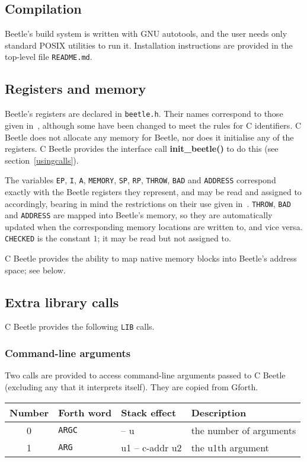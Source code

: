 \documentclass[english]{article}
\newcommand{\spic}[1]{{\spfont\setlength{\baselineskip}{\normalbaselineskip}#1\/}}
\begin{document}
\subsection{Compilation}

Beetle's build system is written with GNU autotools, and the user
needs only standard POSIX utilities to run it. Installation
instructions are provided in the top-level file {\tt README.md}.


\subsection{Registers and memory}

Beetle's registers are declared in {\tt beetle.h}. Their names correspond to
those given in~\cite[section~2.1]{beetle}, although some have been changed
to meet the rules for C identifiers. C Beetle does not allocate any
memory for Beetle, nor does it initialise any of the registers. C Beetle
provides the interface call {\bf init\_beetle()} to do this (see
section~\ref{usingcalls}).

The variables {\tt EP}, {\tt I}, {\tt A}, {\tt MEMORY}, {\tt SP}, {\tt RP}, {\tt THROW}, {\tt BAD} and {\tt ADDRESS}
correspond exactly with the Beetle registers they represent, and may be read
and assigned to accordingly, bearing in mind the restrictions on their use
given in~\cite{beetle}. {\tt THROW}, {\tt BAD} and {\tt ADDRESS} are mapped into Beetle's memory, so they are automatically updated when the corresponding memory locations are written to, and vice versa. {\tt CHECKED} is the constant $1$; it may be read but not assigned to.

C Beetle provides the ability to map native memory blocks into Beetle’s address space; see below.


\subsection{Extra library calls}

C Beetle provides the following {\tt LIB} calls.

\subsubsection{Command-line arguments}

Two calls are provided to access command-line arguments passed to C Beetle (excluding any that it interprets itself). They are copied from Gforth.

\begin{center}
\begin{tabular}{S[table-format=2.0]lll} \toprule
\bf Number & \bf Forth word & \bf Stack effect & \bf Description \\  & {\tt ARGC} & \spic{-- u} & the number of arguments \\
1 & {\tt ARG} & \spic{u1 -- c-addr u2} & the \spic{u1}th argument \\ \bottomrule
\end{tabular}
\end{center}
\end{document}
